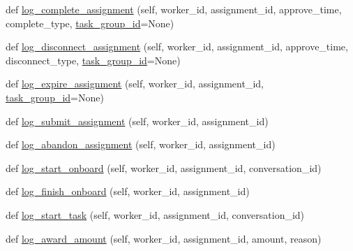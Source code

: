 \begin{DoxyCompactItemize}
\item 
def \hyperlink{classparlai_1_1mturk_1_1core_1_1mturk__data__handler_1_1MTurkDataHandler_a78a1aacc3cce8b8afd0153ad68c09baf}{log\+\_\+complete\+\_\+assignment} (self, worker\+\_\+id, assignment\+\_\+id, approve\+\_\+time, complete\+\_\+type, \hyperlink{classparlai_1_1mturk_1_1core_1_1mturk__data__handler_1_1MTurkDataHandler_abef46871b0b4686b67f0b4dcea99e81c}{task\+\_\+group\+\_\+id}=None)
\item 
def \hyperlink{classparlai_1_1mturk_1_1core_1_1mturk__data__handler_1_1MTurkDataHandler_ac4dc07d7412b426c29678b517daf6094}{log\+\_\+disconnect\+\_\+assignment} (self, worker\+\_\+id, assignment\+\_\+id, approve\+\_\+time, disconnect\+\_\+type, \hyperlink{classparlai_1_1mturk_1_1core_1_1mturk__data__handler_1_1MTurkDataHandler_abef46871b0b4686b67f0b4dcea99e81c}{task\+\_\+group\+\_\+id}=None)
\item 
def \hyperlink{classparlai_1_1mturk_1_1core_1_1mturk__data__handler_1_1MTurkDataHandler_a9395320d0c2a2f00416acd381b5ae0ba}{log\+\_\+expire\+\_\+assignment} (self, worker\+\_\+id, assignment\+\_\+id, \hyperlink{classparlai_1_1mturk_1_1core_1_1mturk__data__handler_1_1MTurkDataHandler_abef46871b0b4686b67f0b4dcea99e81c}{task\+\_\+group\+\_\+id}=None)
\item 
def \hyperlink{classparlai_1_1mturk_1_1core_1_1mturk__data__handler_1_1MTurkDataHandler_a2cebff3c6da14d643bd2bfedce73ba4a}{log\+\_\+submit\+\_\+assignment} (self, worker\+\_\+id, assignment\+\_\+id)
\item 
def \hyperlink{classparlai_1_1mturk_1_1core_1_1mturk__data__handler_1_1MTurkDataHandler_ab4a4d10fa1923efc5dfdcf2e451c816f}{log\+\_\+abandon\+\_\+assignment} (self, worker\+\_\+id, assignment\+\_\+id)
\item 
def \hyperlink{classparlai_1_1mturk_1_1core_1_1mturk__data__handler_1_1MTurkDataHandler_a532f8c2794a6eccf008e7ed9c945e2cb}{log\+\_\+start\+\_\+onboard} (self, worker\+\_\+id, assignment\+\_\+id, conversation\+\_\+id)
\item 
def \hyperlink{classparlai_1_1mturk_1_1core_1_1mturk__data__handler_1_1MTurkDataHandler_a2e2a4005391d49b70050c73315424f5a}{log\+\_\+finish\+\_\+onboard} (self, worker\+\_\+id, assignment\+\_\+id)
\item 
def \hyperlink{classparlai_1_1mturk_1_1core_1_1mturk__data__handler_1_1MTurkDataHandler_a373fe84924d3235c1b461f679c9a0926}{log\+\_\+start\+\_\+task} (self, worker\+\_\+id, assignment\+\_\+id, conversation\+\_\+id)
\item 
def \hyperlink{classparlai_1_1mturk_1_1core_1_1mturk__data__handler_1_1MTurkDataHandler_a399c5d70b0e2509b061f0d0f627a3f01}{log\+\_\+award\+\_\+amount} (self, worker\+\_\+id, assignment\+\_\+id, amount, reason)

\end{DoxyCompactItemize}
